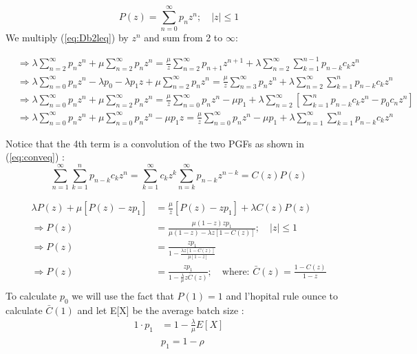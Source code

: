\documentclass{article}
\begin{document}
\begin{equation*}
P(z) = \sum_{n=0}^{\infty} p_n z^n; \quad |z| \leq 1
\end{equation*}
We multiply (\ref{eq:Db2leq}) by $z^n$ and sum from 2 to $\infty$:

\begin{align*}
&\Rightarrow\lambda \sum_{n=2}^{\infty} p_n z^n + \mu \sum_{n=2}^{\infty} p_n z^n = \frac{\mu}{z} \sum_{n=2}^{\infty} p_{n+1} z^{n+1} + \lambda \sum_{n=2}^{\infty} \sum_{k=1}^{n-1} p_{n-k} c_k z^n\\
&\Rightarrow\lambda \sum_{n=0}^{\infty} p_n z^n - \lambda p_0 - \lambda p_1 z + \mu \sum_{n=2}^{\infty} p_n z^n = \frac{\mu}{z} \sum_{n=3}^{\infty} p_{n} z^{n} + \lambda \sum_{n=2}^{\infty} \sum_{k=1}^{n} p_{n-k} c_k z^n\\
&\Rightarrow\lambda \sum_{n=0}^{\infty} p_n z^n + \mu \sum_{n=2}^{\infty} p_n z^n = \frac{\mu}{z} \sum_{n=0}^{\infty} p_{n} z^{n} -\mu p_1 + \lambda \sum_{n=2}^{\infty} \left[\sum_{k=1}^{n} p_{n-k} c_k z^n- p_0c_nz^n\right]\\
&\Rightarrow\lambda \sum_{n=0}^{\infty} p_n z^n + \mu \sum_{n=0}^{\infty} p_n z^n - \mu p_1 z = \frac{\mu}{z} \sum_{n=0}^{\infty} p_{n} z^{n} -\mu p_1 + \lambda \sum_{n=1}^{\infty}\sum_{k=1}^{n} p_{n-k} c_k z^n
\end{align*}

Notice that the 4th term is a convolution of the two PGFs as shown in (\ref{eq:conveq})  :
\begin{equation}
\sum_{n=1}^{\infty} \sum_{k=1}^{n} p_{n-k} c_k z^n = \sum_{k=1}^{\infty} c_k z^k \sum_{n=k}^{\infty} p_{n-k} z^{n-k} = C(z)P(z)
\label{eq:conveq}
\end{equation}

\begin{align*}
\lambda P(z) + \mu [P(z) - zp_1] &= \frac{\mu}{z} [P(z) - zp_1] + \lambda C(z)P(z)\\
\Rightarrow P(z) &= \frac{\mu (1 - z) zp_1}{\mu (1 - z) - \lambda z [1 - C(z)]}; \quad |z| \leq 1\\
\Rightarrow P(z) &= \frac{zp_1}{1 - \frac{\lambda z [1 - C(z)]}{\mu [1 - z]}}\\
\Rightarrow P(z) &= \frac{zp_1}{1 - \frac{\lambda}{\mu} z \bar{C}(z)}; \quad \text{where: } \bar{C}(z) = \frac{1 - C(z)}{1 - z}\\
\end{align*}
To calculate $p_0$ we will use the fact that $ P(1) = 1$ and l'hopital rule ounce to calculate $\bar{C}(1)$ and let E[X] be the average batch size :
\begin{align*}
1\cdot p_1 &=1 - \frac{\lambda}{\mu} E[X]\\
&\boxed{p_1 = 1 - \rho}
\end{align*}
\end{document}
